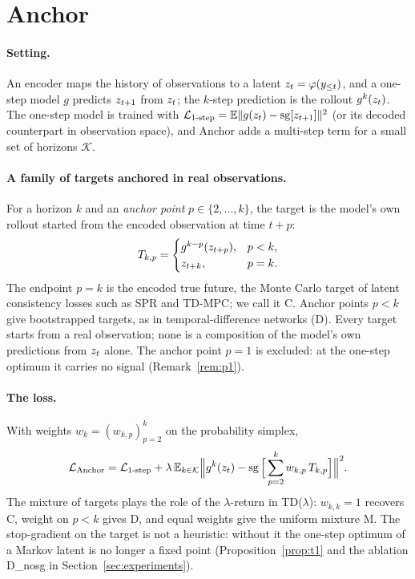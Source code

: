 \section{Anchor}
\label{sec:method}

\paragraph{Setting.}
An encoder maps the history of observations to a latent $z_{t} = \varphi(y_{\le t})$, and a one-step model $g$ predicts $z_{t+1}$ from $z_{t}$; the $k$-step prediction is the rollout $g^{k}(z_{t})$. The one-step model is trained with $\mathcal{L}_{\text{1-step}} = \mathbb{E}\|g(z_{t}) - \operatorname{sg}[z_{t+1}]\|^2$ (or its decoded counterpart in observation space), and Anchor adds a multi-step term for a small set of horizons $\mathcal K$.

\paragraph{A family of targets anchored in real observations.}
For a horizon $k$ and an \emph{anchor point} $p \in \{2, \dots, k\}$, the target is the model's own rollout started from the encoded observation at time $t + p$:
\begin{equation}
  T_{k,p} =
  \begin{cases}
    g^{k-p}(z_{t+p}), & p < k, \\
    z_{t+k}, & p = k .
  \end{cases}
\end{equation}
The endpoint $p = k$ is the encoded true future, the Monte Carlo target of latent consistency losses such as SPR and TD-MPC; we call it C. Anchor points $p < k$ give bootstrapped targets, as in temporal-difference networks (D). Every target starts from a real observation; none is a composition of the model's own predictions from $z_{t}$ alone. The anchor point $p = 1$ is excluded: at the one-step optimum it carries no signal (Remark~\ref{rem:p1}).

\paragraph{The loss.}
With weights $w_{k} = (w_{k,p})_{p=2}^{k}$ on the probability simplex,
\begin{equation}
  \mathcal{L}_{\text{Anchor}} = \mathcal{L}_{\text{1-step}} + \lambda \, \mathbb{E}_{k \in \mathcal K} \Big\| g^{k}(z_{t}) - \operatorname{sg}\Big[ \sum_{p=2}^{k} w_{k,p} \, T_{k,p} \Big] \Big\|^2 .
  \label{eq:anchor}
\end{equation}
The mixture of targets plays the role of the $\lambda$-return in TD($\lambda$): $w_{k,k} = 1$ recovers C, weight on $p < k$ gives D, and equal weights give the uniform mixture M. The stop-gradient on the target is not a heuristic: without it the one-step optimum of a Markov latent is no longer a fixed point (Proposition~\ref{prop:t1} and the ablation D\_nosg in Section~\ref{sec:experiments}).

